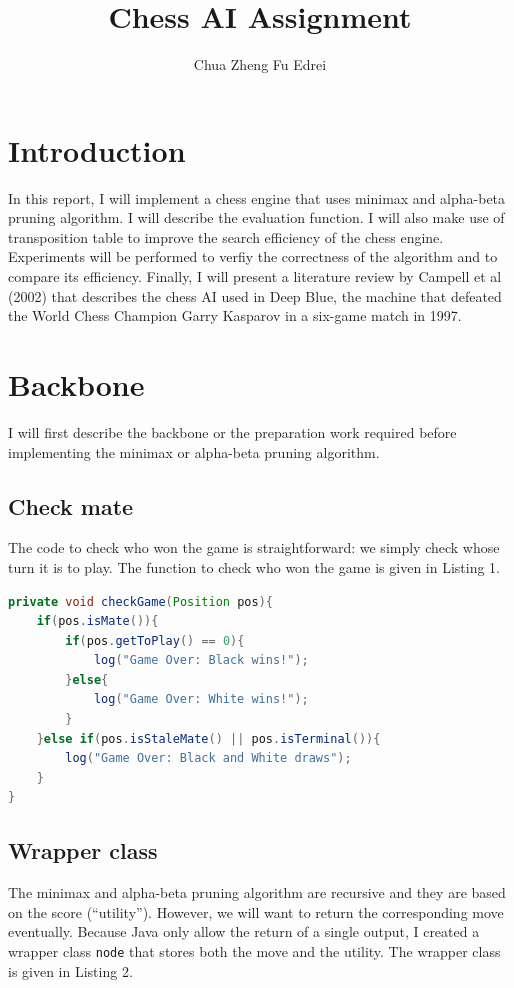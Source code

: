 \documentclass[9.5pt]{extarticle}
\title{Chess AI Assignment}
\author{Chua Zheng Fu Edrei}
\begin{document}
\maketitle

\section{Introduction}

In this report, I will implement a chess engine that uses minimax and alpha-beta pruning algorithm. I will describe the evaluation function. I will also make use of transposition table to improve the search efficiency of the chess engine. Experiments will be performed to verfiy the correctness of the algorithm and to compare its efficiency. Finally, I will present a literature review by Campell et al (2002) that describes the chess AI used in Deep Blue, the machine that defeated the World Chess Champion Garry Kasparov in a six-game match in 1997.


\section{Backbone}

I will first describe the backbone or the preparation work required before implementing the minimax or alpha-beta pruning algorithm.

\subsection{Check mate}

The code to check who won the game is straightforward: we simply check whose turn it is to play. The function to check who won the game is given in Listing 1.

\begin{lstlisting}[language=java,caption={Java function to check who won the game}]
private void checkGame(Position pos){
	if(pos.isMate()){
		if(pos.getToPlay() == 0){
			log("Game Over: Black wins!");
		}else{
			log("Game Over: White wins!");
		}
	}else if(pos.isStaleMate() || pos.isTerminal()){
		log("Game Over: Black and White draws");
	}
}
\end{lstlisting}

\subsection{Wrapper class}

The minimax and alpha-beta pruning algorithm are recursive and they are based on the score (``utility''). However, we will want to return the corresponding move eventually. Because Java only allow the return of a single output, I created a wrapper class \verb`node` that stores both the move and the utility. The wrapper class is given in Listing 2.\\
\end{document}
